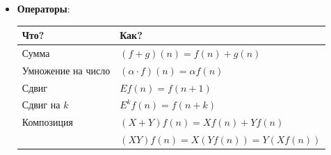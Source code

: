 \documentclass[12pt]{article}
\begin{document}
\begin{itemize}
        $\underset{\text{линейная комб. рекуррентных членов}}{\undergroup{k_1 a_n + k_2 a_{n - 1} + k_3 a_{n - 2} + \dots}} =
        \underset{\text{функция от }n}{\undergroup{f(n)}}$

        Линейное рекуррентное соотношение -- $\begin{cases}f = 0 \Longrightarrow \text{гомогенное (однородное)} \\ f \neq 0 \Longrightarrow \text{негомогенное (неоднородное)}\end{cases}$

        \Exs Последовательность Фибоначчи:

        $F(n) = \begin{cases}0, \quad n = 0 \\ 1, \quad n = 1 \\ F(n - 1) + F(n - 2)\end{cases}$

        $F(n) - F(n - 1) - F(n - 2) = 0$ -- однородное

        \item \textbf{Операторы}:

        \begin{tabular}{ll}
            \hline

            \hfil Что? & \hfil Как? \\

            \hline

            Сумма & $(f + g)(n) = f(n) + g(n)$ \\

            \hline

            Умножение на число & $(\alpha \cdot f)(n) = \alpha f(n)$ \\

            \hline

            Сдвиг & $E f(n) = f(n + 1)$ \\

            \hline

            Сдвиг на $k$ & $E^k f(n) = f(n + k)$ \\

            \hline

            Композиция & $(X + Y) f(n) = Xf(n) + Yf(n)$ \\

             & $(XY) f(n) = X(Yf(n)) = Y(Xf(n))$ \\

        \end{tabular}


\end{itemize}
\end{document}
